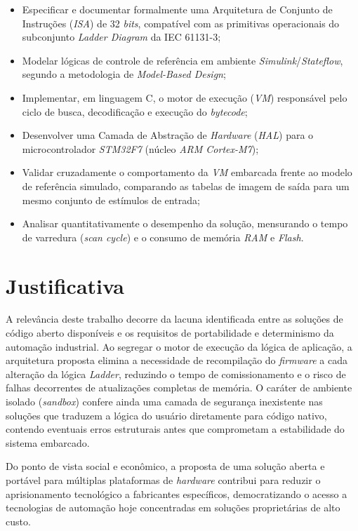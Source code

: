 \begin{itemize}
	\item Especificar e documentar formalmente uma Arquitetura de Conjunto de Instruções (\textit{ISA}) de 32 \textit{bits}, compatível com as primitivas operacionais do subconjunto \textit{Ladder Diagram} da IEC 61131-3;
	\item Modelar lógicas de controle de referência em ambiente \textit{Simulink}/\textit{Stateflow}, segundo a metodologia de \textit{Model-Based Design};
	\item Implementar, em linguagem C, o motor de execução (\textit{VM}) responsável pelo ciclo de busca, decodificação e execução do \textit{bytecode};
	\item Desenvolver uma Camada de Abstração de \textit{Hardware} (\textit{HAL}) para o microcontrolador \textit{STM32F7} (núcleo \textit{ARM Cortex-M7});
	\item Validar cruzadamente o comportamento da \textit{VM} embarcada frente ao modelo de referência simulado, comparando as tabelas de imagem de saída para um mesmo conjunto de estímulos de entrada;
	\item Analisar quantitativamente o desempenho da solução, mensurando o tempo de varredura (\textit{scan cycle}) e o consumo de memória \textit{RAM} e \textit{Flash}.
\end{itemize}


\section{Justificativa}
\label{sec:justificativa}

A relevância deste trabalho decorre da lacuna identificada entre as soluções de código aberto disponíveis e os requisitos de portabilidade e determinismo da automação industrial.
Ao segregar o motor de execução da lógica de aplicação, a arquitetura proposta elimina a necessidade de recompilação do \textit{firmware} a cada alteração da lógica \textit{Ladder}, reduzindo o tempo de comissionamento e o risco de falhas decorrentes de atualizações completas de memória.
O caráter de ambiente isolado (\textit{sandbox}) confere ainda uma camada de segurança inexistente nas soluções que traduzem a lógica do usuário diretamente para código nativo, contendo eventuais erros estruturais antes que comprometam a estabilidade do sistema embarcado.

Do ponto de vista social e econômico, a proposta de uma solução aberta e portável para múltiplas plataformas de \textit{hardware} contribui para reduzir o aprisionamento tecnológico a fabricantes específicos, democratizando o acesso a tecnologias de automação hoje concentradas em soluções proprietárias de alto custo.


